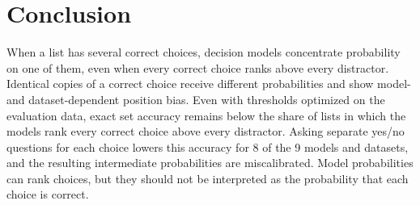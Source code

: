 \section{Conclusion}

When a list has several correct choices, decision models concentrate probability on one of them, even when every correct choice ranks above every distractor. Identical copies of a correct choice receive different probabilities and show model- and dataset-dependent position bias. Even with thresholds optimized on the evaluation data, exact set accuracy remains below the share of lists in which the models rank every correct choice above every distractor. Asking separate yes/no questions for each choice lowers this accuracy for 8 of the 9 models and datasets, and the resulting intermediate probabilities are miscalibrated. Model probabilities can rank choices, but they should not be interpreted as the probability that each choice is correct.
